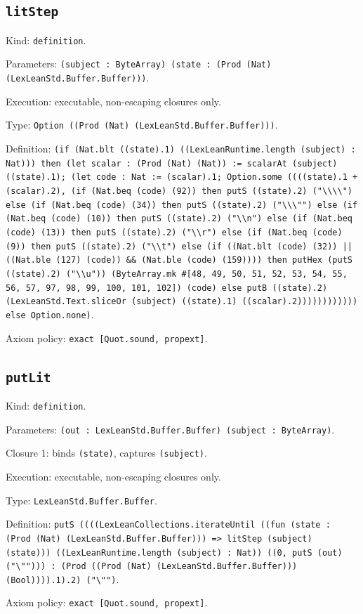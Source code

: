 \documentclass[11pt]{article}
\begin{document}
\subsection*{\texttt{litStep}}
\noindent Kind: \texttt{definition}.\par
\noindent Parameters: \texttt{(subject : ByteArray) (state : (Prod (Nat) (LexLeanStd.Buffer.Buffer)))}.\par
\noindent Execution: executable, non-escaping closures only.\par
\noindent Type: \texttt{Option ((Prod (Nat) (LexLeanStd.Buffer.Buffer)))}.\par
\noindent Definition: \texttt{(if (Nat.blt ((state).1) ((LexLeanRuntime.length (subject) : Nat))) then (let scalar : (Prod (Nat) (Nat)) := scalarAt (subject) ((state).1); (let code : Nat := (scalar).1; Option.some ((((state).1 + (scalar).2), (if (Nat.beq (code) (92)) then putS ((state).2) ("\textbackslash{}\textbackslash{}\textbackslash{}\textbackslash{}") else (if (Nat.beq (code) (34)) then putS ((state).2) ("\textbackslash{}\textbackslash{}\textbackslash{}"") else (if (Nat.beq (code) (10)) then putS ((state).2) ("\textbackslash{}\textbackslash{}n") else (if (Nat.beq (code) (13)) then putS ((state).2) ("\textbackslash{}\textbackslash{}r") else (if (Nat.beq (code) (9)) then putS ((state).2) ("\textbackslash{}\textbackslash{}t") else (if ((Nat.blt (code) (32)) || ((Nat.ble (127) (code)) \&\& (Nat.ble (code) (159)))) then putHex (putS ((state).2) ("\textbackslash{}\textbackslash{}u")) (ByteArray.mk \#[48, 49, 50, 51, 52, 53, 54, 55, 56, 57, 97, 98, 99, 100, 101, 102]) (code) else putB ((state).2) (LexLeanStd.Text.sliceOr (subject) ((state).1) ((scalar).2)))))))))))) else Option.none)}.\par
\noindent Axiom policy: \texttt{exact [Quot.sound, propext]}.\par
\subsection*{\texttt{putLit}}
\noindent Kind: \texttt{definition}.\par
\noindent Parameters: \texttt{(out : LexLeanStd.Buffer.Buffer) (subject : ByteArray)}.\par
\noindent Closure 1: binds \texttt{(state)}, captures \texttt{(subject)}.\par
\noindent Execution: executable, non-escaping closures only.\par
\noindent Type: \texttt{LexLeanStd.Buffer.Buffer}.\par
\noindent Definition: \texttt{putS ((((LexLeanCollections.iterateUntil ((fun (state : (Prod (Nat) (LexLeanStd.Buffer.Buffer))) => litStep (subject) (state))) ((LexLeanRuntime.length (subject) : Nat)) ((0, putS (out) ("\textbackslash{}""))) : (Prod ((Prod (Nat) (LexLeanStd.Buffer.Buffer))) (Bool)))).1).2) ("\textbackslash{}"")}.\par
\noindent Axiom policy: \texttt{exact [Quot.sound, propext]}.\par
\end{document}
